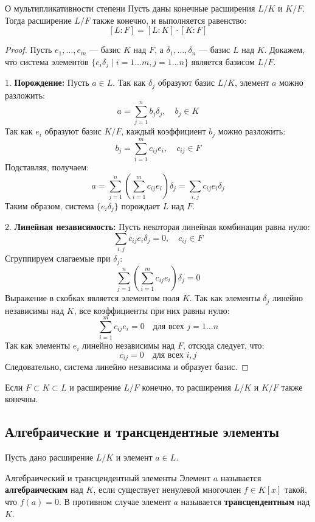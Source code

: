\begin{Theorem}{О мультипликативности степени}{}
	Пусть даны конечные расширения $L/K$ и $K/F$. Тогда расширение $L/F$ также конечно, и выполняется равенство:
	\[ [L:F] = [L:K] \cdot [K:F] \]
\end{Theorem}

\begin{proof}
	Пусть $e_1, \dots, e_m$ --- базис $K$ над $F$, а $\delta_1, \dots, \delta_n$ --- базис $L$ над $K$.
	Докажем, что система элементов $\{ e_i \delta_j \mid i=1\dots m, j=1\dots n \}$ является базисом $L/F$.
	
	1. \textbf{Порождение:} Пусть $a \in L$. Так как $\delta_j$ образуют базис $L/K$, элемент $a$ можно разложить:
	\[ a = \sum_{j=1}^n b_j \delta_j, \quad b_j \in K \]
	Так как $e_i$ образуют базис $K/F$, каждый коэффициент $b_j$ можно разложить:
	\[ b_j = \sum_{i=1}^m c_{ij} e_i, \quad c_{ij} \in F \]
	Подставляя, получаем:
	\[ a = \sum_{j=1}^n \left( \sum_{i=1}^m c_{ij} e_i \right) \delta_j = \sum_{i,j} c_{ij} e_i \delta_j \]
	Таким образом, система $\{ e_i \delta_j \}$ порождает $L$ над $F$.
	
	2. \textbf{Линейная независимость:} Пусть некоторая линейная комбинация равна нулю:
	\[ \sum_{i,j} c_{ij} e_i \delta_j = 0, \quad c_{ij} \in F \]
	Сгруппируем слагаемые при $\delta_j$:
	\[ \sum_{j=1}^n \left( \sum_{i=1}^m c_{ij} e_i \right) \delta_j = 0 \]
	Выражение в скобках является элементом поля $K$. Так как элементы $\delta_j$ линейно независимы над $K$, все коэффициенты при них равны нулю:
	\[ \sum_{i=1}^m c_{ij} e_i = 0 \quad \text{для всех } j=1\dots n \]
	Так как элементы $e_i$ линейно независимы над $F$, отсюда следует, что:
	\[ c_{ij} = 0 \quad \text{для всех } i, j \]
	Следовательно, система линейно независима и образует базис.
\end{proof}

\begin{Remark}{}{}
	Если $F \subset K \subset L$ и расширение $L/F$ конечно, то расширения $L/K$ и $K/F$ также конечны.
\end{Remark}

\subsection{Алгебраические и трансцендентные элементы}

Пусть дано расширение $L/K$ и элемент $a \in L$.

\begin{Definition}{Алгебраический и трансцендентный элементы}{}
	Элемент $a$ называется \textbf{алгебраическим} над $K$, если существует ненулевой многочлен $f \in K[x]$ такой, что $f(a) = 0$.
	В противном случае элемент $a$ называется \textbf{трансцендентным} над $K$.
\end{Definition}

